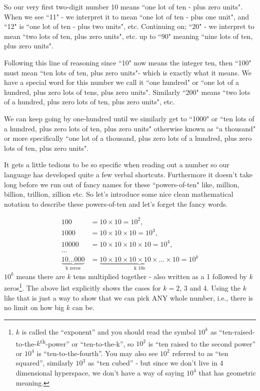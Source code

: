 \documentclass{article}
\begin{document}
So our very first two-digit number 10 means ``one lot of ten - plus zero units".
When we see ``11" - we interpret it to mean ``one lot of ten - plus one unit",
and ``12" is ``one lot of ten - plus two units", etc.
Continuing on; ``20" - we interpret to mean ``two lots of ten,
plus zero units", etc. up to ``90" meaning ``nine lots of ten,
plus zero units".

Following this line of reasoning since ``10" now means the integer ten,
then ``100" must mean ``ten lots of ten,
plus zero units"- which is exactly what it means.
We have a special word for this number we call it ``one hundred" or ``one lot of a hundred,
plus zero lots of tens, plus zero units".
Similarly ``200" means ``two lots of a hundred, plus zero lots of ten,
plus zero units", etc.

We can keep going by one-hundred until we similarly get to ``1000" or ``ten lots of a hundred,
plus zero lots of ten, plus zero units" otherwise known
as ``a thousand" or more specifically ``one lot of a thousand,
plus zero lots of a hundred, plus zero lots of ten, plus zero units".

It gets a little tedious to be so specific when reading out
a number so our language has developed quite a few verbal shortcuts.
Furthermore it doesn't take long before we run out of fancy names
for these ``powers-of-ten" like, million, billion, trillion,
zillion etc. So let's introduce some nice clean mathematical notation
to describe these powers-of-ten and let's forget the fancy words.

\begin{align*}
100&=10\times10=10^2,\\
1000&= 10\times10\times10=10^3,\\
10000&= 10\times10\times10\times10=10^4,\\
\dots{}\\
\underbrace{10\dots{}000}_\text{k zeros}&= \underbrace{10\times10\times10\times10\times\dots{}\times10}_\text{k 10s}=10^k
\end{align*}
$10^k$ means there are $k$ tens multiplied together - 
also written as a 1 followed by $k$ zeros\footnote{$k$ is called the ``exponent'' and you should
read the symbol $10^k$ as ``ten-raised-to-the-$k$\textsuperscript{th}-power'' or ``ten-to-the-k'',
so $10^2$ is ``ten raised to the second power'' or $10^4$ is ``ten-to-the-fourth''.
You may also see $10^2$ referred to as ``ten squared'', similarly $10^3$ as ``ten cubed'' - but since we 
don't live in 4 dimensional hyperspace, we don't have a way of saying $10^4$ that has geometric meaning.}.
The above list explicitly shows the cases for $k = 2$, 3 and 4.
Using the $k$ like that is just a way to show that we can pick ANY whole number,
i.e., there is no limit on how big $k$ can be.
\end{document}
